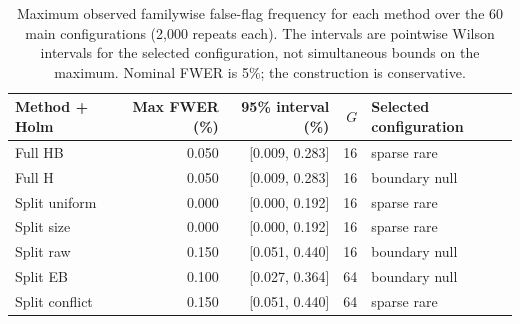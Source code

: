 \begin{table}[t]
\centering\small
\caption{Maximum observed familywise false-flag frequency for each method over the 60 main configurations (2,000 repeats each). The intervals are pointwise Wilson intervals for the selected configuration, not simultaneous bounds on the maximum. Nominal FWER is 5\%; the construction is conservative.}\label{tab:fwer}
\begin{tabular}{lrrrl}
\toprule
Method + Holm & Max FWER (\%) & 95\% interval (\%) & $G$ & Selected configuration \\
\midrule
Full HB & 0.050 & [0.009, 0.283] & 16 & sparse rare \\
Full H & 0.050 & [0.009, 0.283] & 16 & boundary null \\
Split uniform & 0.000 & [0.000, 0.192] & 16 & sparse rare \\
Split size & 0.000 & [0.000, 0.192] & 16 & sparse rare \\
Split raw & 0.150 & [0.051, 0.440] & 16 & boundary null \\
Split EB & 0.100 & [0.027, 0.364] & 64 & boundary null \\
Split conflict & 0.150 & [0.051, 0.440] & 64 & sparse rare \\
\bottomrule
\end{tabular}
\end{table}
